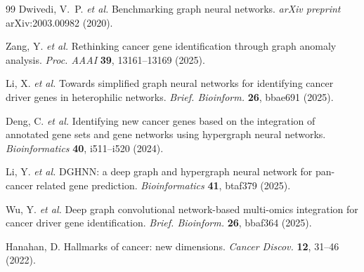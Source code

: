 \begin{thebibliography}{99}
Dwivedi, V.\ P. \textit{et al.}
Benchmarking graph neural networks.
\textit{arXiv preprint} arXiv:2003.00982 (2020).

Zang, Y. \textit{et al.}
Rethinking cancer gene identification through graph anomaly analysis.
\textit{Proc. AAAI} \textbf{39}, 13161--13169 (2025).

Li, X. \textit{et al.}
Towards simplified graph neural networks for identifying cancer driver genes in
heterophilic networks.
\textit{Brief. Bioinform.} \textbf{26}, bbae691 (2025).

Deng, C. \textit{et al.}
Identifying new cancer genes based on the integration of annotated gene sets and
gene networks using hypergraph neural networks.
\textit{Bioinformatics} \textbf{40}, i511--i520 (2024).

Li, Y. \textit{et al.}
DGHNN: a deep graph and hypergraph neural network for pan-cancer related gene
prediction.
\textit{Bioinformatics} \textbf{41}, btaf379 (2025).

Wu, Y. \textit{et al.}
Deep graph convolutional network-based multi-omics integration for cancer driver
gene identification.
\textit{Brief. Bioinform.} \textbf{26}, bbaf364 (2025).

Hanahan, D.
Hallmarks of cancer: new dimensions.
\textit{Cancer Discov.} \textbf{12}, 31--46 (2022).

\end{thebibliography}
